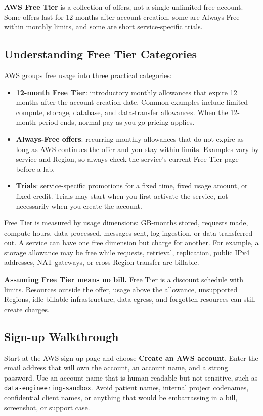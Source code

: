 \begin{definitionbox}
\textbf{AWS Free Tier} is a collection of offers, not a single unlimited free account. Some offers last for 12 months after account creation, some are Always Free within monthly limits, and some are short service-specific trials.
\end{definitionbox}

\subsection{Understanding Free Tier Categories}
AWS groups free usage into three practical categories:

\begin{itemize}
    \item \textbf{12-month Free Tier}: introductory monthly allowances that expire 12 months after the account creation date. Common examples include limited compute, storage, database, and data-transfer allowances. When the 12-month period ends, normal pay-as-you-go pricing applies.
    \item \textbf{Always-Free offers}: recurring monthly allowances that do not expire as long as AWS continues the offer and you stay within limits. Examples vary by service and Region, so always check the service's current Free Tier page before a lab.
    \item \textbf{Trials}: service-specific promotions for a fixed time, fixed usage amount, or fixed credit. Trials may start when you first activate the service, not necessarily when you create the account.
\end{itemize}

Free Tier is measured by usage dimensions: GB-months stored, requests made, compute hours, data processed, messages sent, log ingestion, or data transferred out. A service can have one free dimension but charge for another. For example, a storage allowance may be free while requests, retrieval, replication, public IPv4 addresses, NAT gateways, or cross-Region transfer are billable.

\begin{pitfall}
\textbf{Assuming Free Tier means no bill.} Free Tier is a discount schedule with limits. Resources outside the offer, usage above the allowance, unsupported Regions, idle billable infrastructure, data egress, and forgotten resources can still create charges.
\end{pitfall}

\subsection{Sign-up Walkthrough}
Start at the AWS sign-up page and choose \textbf{Create an AWS account}. Enter the email address that will own the account, an account name, and a strong password. Use an account name that is human-readable but not sensitive, such as \texttt{data-engineering-sandbox}. Avoid patient names, internal project codenames, confidential client names, or anything that would be embarrassing in a bill, screenshot, or support case.

